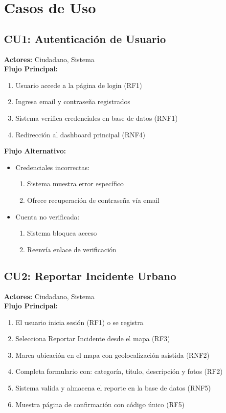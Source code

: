 \section{Casos de Uso}

\begin{multicols}{2}

\subsection*{CU1: Autenticación de Usuario}
\textbf{Actores:} Ciudadano, Sistema\\
\textbf{Flujo Principal:}
\begin{enumerate}
    \item Usuario accede a la página de login (RF1)
    \item Ingresa email y contraseña registrados
    \item Sistema verifica credenciales en base de datos (RNF1)
    \item Redirección al dashboard principal (RNF4)
\end{enumerate}

\textbf{Flujo Alternativo:}
\begin{itemize}
    \item Credenciales incorrectas:
    \begin{enumerate}
        \item Sistema muestra error específico
        \item Ofrece recuperación de contraseña vía email
    \end{enumerate}
    \item Cuenta no verificada:
    \begin{enumerate}
        \item Sistema bloquea acceso
        \item Reenvía enlace de verificación
    \end{enumerate}
\end{itemize}

\subsection*{CU2: Reportar Incidente Urbano}
\textbf{Actores:} Ciudadano, Sistema\\
\textbf{Flujo Principal:}
\begin{enumerate}
    \item El usuario inicia sesión (RF1) o se registra
    \item Selecciona Reportar Incidente desde el mapa (RF3)
    \item Marca ubicación en el mapa con geolocalización asistida (RNF2)
    \item Completa formulario con: categoría, título, descripción y fotos (RF2)
    \item Sistema valida y almacena el reporte en la base de datos (RNF5)
    \item Muestra página de confirmación con código único (RF5)
\end{enumerate}


\end{multicols}
